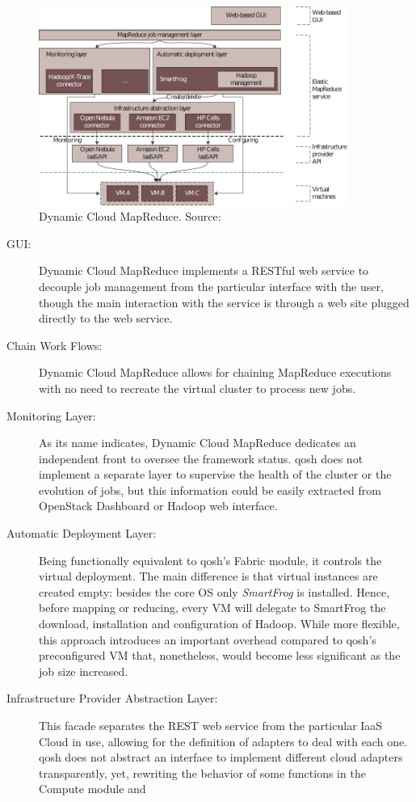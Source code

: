 \begin{figure}[tbp]
\begin{center}
\includegraphics[width=0.9\textwidth]{imagenes/037.pdf}
 \caption{Dynamic Cloud MapReduce. Source: \cite{dynamicmapreduce}}
\label{fig:arquitecturadynamicmapreduce}
\end{center}
\end{figure}

\begin{description}
    \item[GUI:] Dynamic Cloud MapReduce implements a RESTful web service to decouple job management from the particular interface with the user, though the main interaction with the service is through a web site plugged directly to the web service.
    \item[Chain Work Flows:] Dynamic Cloud MapReduce allows for chaining MapReduce executions with no need to recreate the virtual cluster to process new jobs.
    \item[Monitoring Layer:] As its name indicates, Dynamic Cloud MapReduce dedicates an independent front to oversee the framework status. qosh does not implement a separate layer to supervise the health of the cluster or the evolution of jobs, but this information could be easily extracted from OpenStack Dashboard or Hadoop web interface.
    \item[Automatic Deployment Layer:] Being functionally equivalent to qosh's Fabric module, it controls the virtual deployment. The main difference is that virtual instances are created empty: besides the core OS only \emph{SmartFrog} is installed. Hence, before mapping or reducing, every VM will delegate to SmartFrog the download, installation and configuration of Hadoop.
    While more flexible, this approach introduces an important overhead compared to qosh's preconfigured VM that, nonetheless, would become less significant as the job size increased.
    \item[Infrastructure Provider Abstraction Layer:] This facade separates the REST web service from the particular IaaS Cloud in use, allowing for the definition of adapters to deal with each one. qosh does not abstract an interface to implement different cloud adapters transparently, yet, rewriting the behavior of some functions in the Compute module and 
\end{description}


